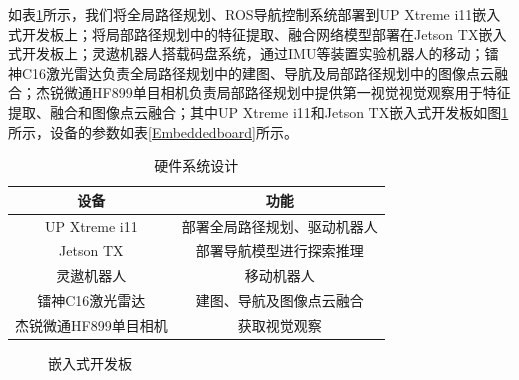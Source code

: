 如表\ref{hardcore}所示，我们将全局路径规划、ROS导航控制系统部署到UP Xtreme i11嵌入式开发板上；将局部路径规划中的特征提取、融合网络模型部署在Jetson TX嵌入式开发板上；灵遨机器人搭载码盘系统，通过IMU等装置实验机器人的移动；镭神C16激光雷达负责全局路径规划中的建图、导肮及局部路径规划中的图像点云融合；杰锐微通HF899单目相机负责局部路径规划中提供第一视觉视觉观察用于特征提取、融合和图像点云融合；其中UP Xtreme i11和Jetson TX嵌入式开发板如图\ref{boardfig}所示，设备的参数如表\ref{Embeddedboard}所示。
\begin{table}
    \caption{\label{hardcore}硬件系统设计}
    \centering
    \small
    \begin{tabular}{cc}
        \hline
        设备 & 功能 \tabularnewline 
        \hline 
        UP Xtreme i11 & 部署全局路径规划、驱动机器人 \tabularnewline
        Jetson TX & 部署导航模型进行探索推理 \tabularnewline
        灵遨机器人 & 移动机器人 \tabularnewline
        镭神C16激光雷达 & 建图、导航及图像点云融合 \tabularnewline
        杰锐微通HF899单目相机 & 获取视觉观察 \tabularnewline
        \hline 
    \end{tabular}
\end{table}


\begin{figure}[h]
    \centering
    \caption{嵌入式开发板}
    \label{boardfig}
\end{figure}


